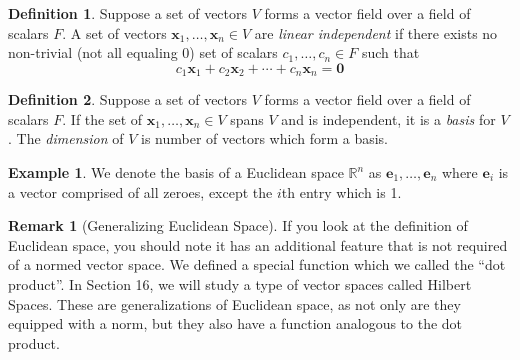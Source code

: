 \documentclass{article}
\newcommand{\R}{\mathbb{R}}
\newcommand{\x}{\mathbf{x}}
\theoremstyle{definition}
\newtheorem{definition}{Definition}[section]
\newtheorem{example}{Example}[section]
\newtheorem{remark}{Remark}[section]
\begin{document}
	\begin{definition}
		Suppose a set of vectors $ V $ forms a vector field over a field of scalars $ F $. A set of vectors $ \x_1,\ldots,\x_n\in V $ are \textit{\color{red}linear independent} if there exists no non-trivial (not all equaling $ 0 $) set of scalars $ c_1,\ldots,c_n\in F $ such that $$ c_1\x_1 + c_2\x_2 +\cdots + c_n\x_n  = \mathbf{0}$$
	\end{definition}
	\begin{definition}
		Suppose a set of vectors $ V $ forms a vector field over a field of scalars $ F $. If the set of $ \x_1,\ldots,\x_n\in V $ spans $ V $ and is independent, it is a \textit{\color{red}basis} for $ V $. The \textit{\color{red} dimension} of $ V $ is number of vectors which form a basis. 
	\end{definition}
	\begin{example}
		We denote the basis of a Euclidean space $ \R^n $ as $ {\mathbf e_1,\ldots,\mathbf e_n} $ where $ \mathbf{e}_i $ is a vector comprised of all zeroes, except the $ i $th entry which is 1. 
	\end{example}
	\begin{remark}[Generalizing Euclidean Space]
		If you look at the definition of Euclidean space, you should note it has an additional feature that is not required of a normed vector space. We defined a special function which we called the ``dot product''. In Section 16, we will study a type of vector spaces called Hilbert Spaces. These are 
		generalizations of Euclidean space, as not only are they equipped with a norm, but they also have a function analogous to the dot product. 
	\end{remark}
\end{document}
